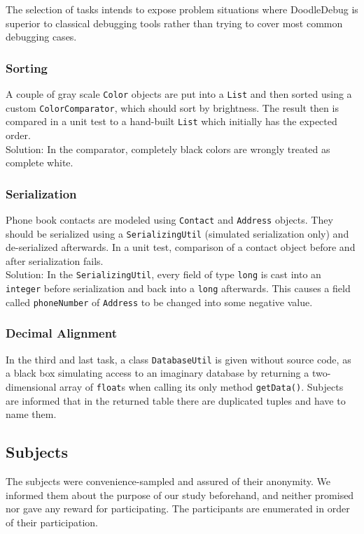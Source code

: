 \documentclass[english]{scrartcl}
\newcommand\nes[1]{\nbc{nes}{#1}{blue}}
\newcommand{\DD}{Dood\-le\-De\-bug\xspace}
\begin{document}
The selection of tasks intends to expose problem situations where \DD is superior to classical debugging tools rather than trying to cover most common debugging cases.

\subsubsection{Sorting}
A couple of gray scale \texttt{Color} objects are put into a \texttt{List} 
and then sorted using a custom \texttt{ColorComparator}, which should sort by brightness. 
The result then is compared in a unit test to a hand-built \texttt{List} which initially has the expected order.\\
Solution: In the comparator, completely black colors are wrongly treated as complete white.

\subsubsection{Serialization}
Phone book contacts are modeled using \texttt{Con\-tact} and \texttt{Address}  objects. 
They should be serialized using a \texttt{Ser\-ializ\-ing\-Util} (simulated serialization only) and de-serialized afterwards.
In a unit test, comparison of a contact object before and after serialization fails.\\
Solution: In the \texttt{SerializingUtil}, every field of type \texttt{long} is cast %
into an \texttt{integer} before serialization and back into a \texttt{long} afterwards. 
This causes a field called \texttt{phoneNumber} of \texttt{Address} to be changed into some negative value.

\subsubsection{Decimal Alignment}
In the third and last task, a class \texttt{DatabaseUtil} is given without source code, as a black box simulating access to an imaginary database by returning a two-dimensional array of \texttt{float}s when calling its only method \texttt{getData()}. 
Subjects are informed that in the returned table there are duplicated tuples and have to name them.

\subsection{Subjects}
\nes{Move this up.}
The subjects were convenience-sampled and assured of their anonymity. We informed them about the purpose of our study beforehand, and neither promised nor gave any reward for participating. The participants are enumerated in order of their participation.
\end{document}
